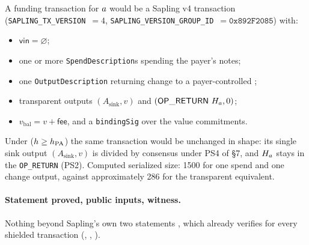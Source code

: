 \begin{construction}
\label{con:pp-a}
A funding transaction for $a$ would be a Sapling v4 transaction
(\texttt{SAPLING\_TX\_VERSION}~$=4$, \texttt{SAPLING\_VERSION\_GROUP\_ID}~$= \mathtt{0x892F2085}$)
with:
\begin{itemize}
  \item $\mathsf{vin} = \varnothing$;
  \item one or more \texttt{Spend\allowbreak{}Description}s spending the payer's notes;
  \item one \texttt{Output\allowbreak{}Description} returning change to a payer-controlled \zaddr;
  \item transparent outputs $(A_{\mathrm{sink}}, v)$ and $(\mathsf{OP\_RETURN}\ H_{a}, 0)$;
  \item $v_{\mathrm{bal}} = v + \mathsf{fee}$, and a \texttt{bindingSig} over the value commitments.
\end{itemize}
Under \PNR{} ($h \ge h_{\mathrm{PA}}$) the same transaction would be unchanged in shape: its single sink
output $(A_{\mathrm{sink}}, v)$ is divided by consensus under PS4 of \S7, and $H_{a}$ stays in the
\texttt{OP\_RETURN} (PS2). Computed serialized size:
\qty{1500}{\byte} for one spend and one change output, against approximately \qty{286}{\byte} for the
transparent equivalent.
\end{construction}

\paragraph{Statement proved, public inputs, witness.} Nothing beyond Sapling's own two statements
\citep{zcashprotocol}, which \fluxd{} already verifies for every shielded transaction (\shipped,
, ).

